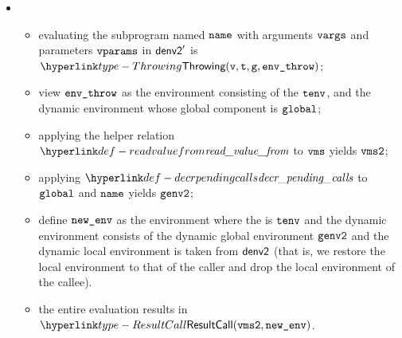 \begin{itemize}
\begin{itemize}
    \item {}
    \begin{itemize}
      \item evaluating the subprogram named $\name$ with arguments $\vvargs$ and parameters $\vvparams$ in
            $\denvtwo'$ is $\Throwing(\vv, \vt, \vg, \envthrow)$\ProseOrDynErrorDiverging;
      \item view $\envthrow$ as the environment consisting of the \staticenvironmentterm{} $\tenv$,
            and the dynamic environment whose global component is $\vglobal$;
      \item applying the helper relation $\readvaluefrom$ to $\vms$ yields $\vmstwo$;
      \item applying $\decrpendingcalls$ to $\vglobal$ and $\name$ yields $\genvtwo$;
      \item define $\newenv$ as the environment where the \staticenvironmentterm{} is $\tenv$ and the dynamic environment consists
            of the dynamic global environment $\genvtwo$ and the dynamic local environment is taken from $\denvtwo$
            (that is, we restore the local environment to that of the caller and drop the local environment of the callee).
      \item the entire evaluation results in $\ResultCall(\vmstwo, \newenv)$.
    \end{itemize}
  \end{itemize}
\end{itemize}

\FormallyParagraph
\begin{mathpar}
\end{mathpar}

